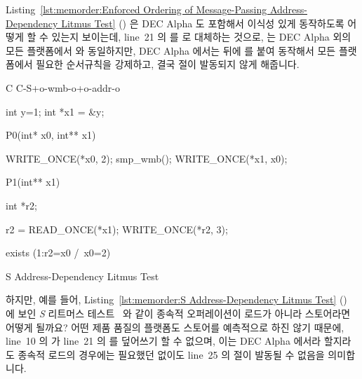 Listing~\ref{lst:memorder:Enforced Ordering of Message-Passing Address-Dependency Litmus Test}
()
은 DEC Alpha 도 포함해서 이식성 있게 동작하도록 어떻게 할 수 있는지 보이는데,
line~21 의  를  로 대체하는 것으로,
 는 DEC Alpha 외의 모든 플랫폼에서 
와 동일하지만, DEC Alpha 에서는  뒤에  를 붙여
동작해서 모든 플랫폼에서 필요한 순서규칙을 강제하고, 결국  절이
발동되지 않게 해줍니다.

\begin{listing}[tbp]
{ \scriptsize
\begin{verbbox}[\LstLineNo]
C C-S+o-wmb-o+o-addr-o

{
int y=1;
int *x1 = &y;
}

P0(int* x0, int** x1) {

  WRITE_ONCE(*x0, 2);
  smp_wmb();
  WRITE_ONCE(*x1, x0);

}

P1(int** x1) {

  int *r2;

  r2 = READ_ONCE(*x1);
  WRITE_ONCE(*r2, 3);

}

exists (1:r2=x0 /\ x0=2)
\end{verbbox}
}
\centering
\theverbbox
\caption{S Address-Dependency Litmus Test}
\label{lst:memorder:S Address-Dependency Litmus Test}
\end{listing}

하지만, 예를 들어,
Listing~\ref{lst:memorder:S Address-Dependency Litmus Test}
() 에 보인 \emph{S} 리트머스
테스트~\cite{JadeAlglave2011ppcmem} 와 같이 종속적 오퍼레이션이 로드가 아니라
스토어라면 어떻게 될까요?
어떤 제품 품질의 플랫폼도 스토어를 예측적으로 하진 않기 때문에, line~10 의
 가 line~21 의  를 덮어쓰기 할 수 없으며,
이는 DEC Alpha 에서라 할지라도 종속적 로드의 경우에는 필요했던
 없이도 line~25 의  절이 발동될 수 없음을
의미합니다.
\iffalse

